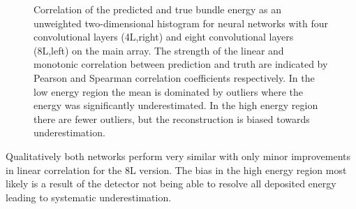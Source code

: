 \documentclass[
  tucolor,       %
  BCOR=12mm,     %
  parskip=half,  %
  open=any,      %
  cleardoublepage=plain,  %
]{tudothesis}
\begin{document}
\begin{figure}[h]
\begin{minipage}[t]{0.49\textwidth}
  \end{minipage}  
  \caption{Correlation of the predicted and true bundle energy as an unweighted two-dimensional histogram for neural networks with four convolutional layers (4L,right) and eight convolutional layers (8L,left) on the main array. The strength of the linear and monotonic correlation between prediction and truth are indicated by Pearson and Spearman correlation coefficients respectively. In the low energy region the mean is dominated by outliers where the energy was significantly underestimated. In the high energy region there are fewer outliers, but the reconstruction is biased towards underestimation.}
  \label{fig:Correlation 8L}
\end{figure}

Qualitatively both networks perform very similar with only minor improvements in linear correlation for the 8L version. 
The bias in the high energy region most likely is a result of the detector not being able to resolve all deposited energy leading to systematic underestimation.
\end{document}
